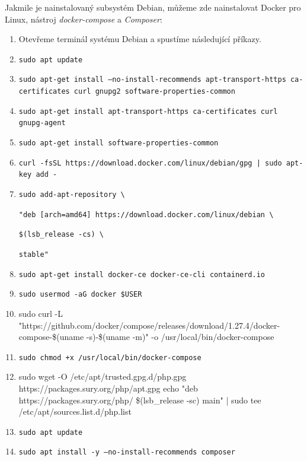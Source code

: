 \documentclass[czech,master]{diploma}
\begin{document}
Jakmile je nainstalovaný subsystém Debian, můžeme zde nainstalovat Docker pro Linux, nástroj \textit{docker-compose} a \textit{Composer}:
\begin{enumerate}
\item Otevřeme terminál systému Debian a spustíme následující příkazy.
\item \texttt{sudo apt update}
\item \texttt{sudo apt-get install --no-install-recommends apt-transport-https ca-certificates curl gnupg2 software-properties-common}
\item \texttt{sudo apt-get install apt-transport-https ca-certificates curl gnupg-agent}
\item \texttt{sudo apt-get install software-properties-common}
\item \texttt{curl -fsSL https://download.docker.com/linux/debian/gpg | sudo apt-key add -}
\item \texttt{sudo add-apt-repository \textbackslash}

  \texttt{"deb [arch=amd64] https://download.docker.com/linux/debian \textbackslash}
  
  \texttt{\$(lsb\_release -cs) \textbackslash}
  
  \texttt{stable"}

\item \texttt{sudo apt-get install docker-ce docker-ce-cli containerd.io}
\item \texttt{sudo usermod -aG docker \$USER}
\item sudo curl -L "https://github.com/docker/compose/releases/download/1.27.4/docker-compose-\$(uname -s)-\$(uname -m)" -o /usr/local/bin/docker-compose
\item \texttt{sudo chmod +x /usr/local/bin/docker-compose}
\item sudo wget -O /etc/apt/trusted.gpg.d/php.gpg https://packages.sury.org/php/apt.gpg
echo "deb https://packages.sury.org/php/ \$(lsb\_release -sc) main" | sudo tee /etc/apt/sources.list.d/php.list
\item \texttt{sudo apt update}
\item \texttt{sudo apt install -y --no-install-recommends composer}

\end{enumerate}
\end{document}

